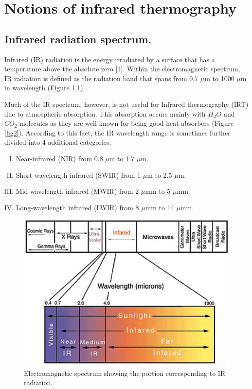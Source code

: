 \pagestyle{standard}

\chapter{Notions of infrared thermography}

	\thispagestyle{chapter-first-page}
	
	\section{Infrared radiation spectrum.}
	
		Infrared (IR) radiation is the energy irradiated by a surface that has a temperature above the absolute zero [1]. Within the electromagnetic spectrum, IR radiation is defined as the radiation band that spans from 0.7 $\mu$m to 1000 $\mu$m in wavelength (Figure \ref{fig1}).
		
		Much of the IR spectrum, however, is not useful for Infrared thermography (IRT) due to atmospheric absorption. This absorption occurs mainly with $H_{2}O$ and $CO_{2}$ molecules as they are well known for being good heat absorbers (Figure \ref{fig2}). According to this fact, the IR wavelength range is sometimes further divided into 4 additional categories:

		\begin{enumerate}[I.]
			\item Near-infrared (NIR) from 0.8 $\mu$m to 1.7 $\mu$m.
			\item Short-wavelength infrared (SWIR) from 1 $\mu$m to 2.5 $\mu$m.
			\item Mid-wavelength infrared (MWIR) from 2 $\mu$mm to 5 $\mu$mm.
			\item Long-wavelength infrared (LWIR) from 8 $\mu$mm to 14 $\mu$mm.
		\end{enumerate}
		
		\begin{figure}[ht!]
			\centering
			\captionsetup{justification=centering,margin=2cm}
			\includegraphics[scale=0.75]{Figures/Chapter01/lightspectrum}
			\caption{\label{fig1} Electromagnetic spectrum showing the portion corresponding to IR radiation.}
		\end{figure}
		
